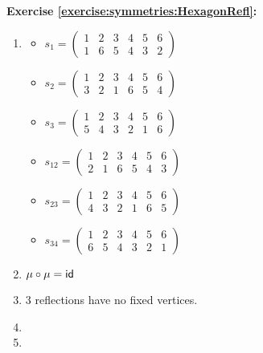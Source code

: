\noindent\textbf{Exercise \ref{exercise:symmetries:HexagonRefl}:}
\begin{enumerate}[{a.}]
\item
	\begin{multicols}{2}
	\begin{itemize}
	\item
	$s_1=\begin{pmatrix}
	1 & 2 & 3 & 4 & 5 & 6\\
	1 & 6 & 5 & 4 & 3 & 2
	\end{pmatrix}$

	\item
	$s_2=\begin{pmatrix}
	1 & 2 & 3 & 4 & 5 & 6\\
	3 & 2 & 1 & 6 & 5 & 4
	\end{pmatrix}$

	\item
	$s_3=\begin{pmatrix}
	1 & 2 & 3 & 4 & 5 & 6\\
	5 & 4 & 3 & 2 & 1 & 6
	\end{pmatrix}$
	
	\item
	$s_{12}=\begin{pmatrix}
	1 & 2 & 3 & 4 & 5 & 6\\
	2 & 1 & 6 & 5 & 4 & 3
	\end{pmatrix}$


	\item
	$s_{23}=\begin{pmatrix}
	1 & 2 & 3 & 4 & 5 & 6\\
	4 & 3 & 2 & 1 & 6 & 5
	\end{pmatrix}$
	
	\item
	$s_{34}=\begin{pmatrix}
	1 & 2 & 3 & 4 & 5 & 6\\
	6 & 5 & 4 & 3 & 2 & 1
	\end{pmatrix}$
	\end{itemize}
	\end{multicols}
	
\item
$\mu\circ\mu = \sf{id}$

\item
3 reflections have no fixed vertices.

\item

\item

\end{enumerate}

